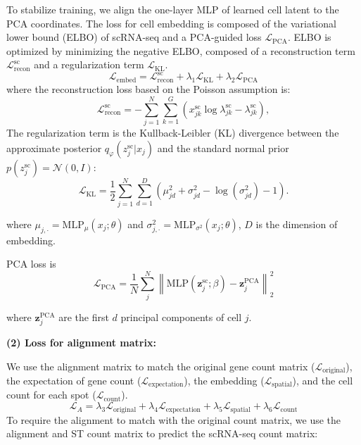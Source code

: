 \documentclass[10pt,a4paper]{article}
\begin{document}
To stabilize training, we align the one-layer MLP of learned cell latent to the PCA coordinates. The loss for cell embedding is composed of the variational lower bound (ELBO) of scRNA-seq and a PCA-guided loss $\mathcal{L}_{\mathrm{PCA}}$. ELBO is optimized by minimizing the negative ELBO, composed of a reconstruction term $\mathcal{L}_{\mathrm{recon}}^{\mathrm{sc}}$ and a regularization term $\mathcal{L}_{\mathrm{KL}}$.
\begin{equation}
\mathcal{L}_{\mathrm{embed}} = \mathcal{L}_{\mathrm{recon}}^{\mathrm{sc}} + \lambda_{1} \mathcal{L}_{\mathrm{KL}} + \lambda_{2} \mathcal{L}_{\mathrm{PCA}}
\end{equation}
where the reconstruction loss based on the Poisson assumption is:
\begin{equation}
\mathcal{L}_{\mathrm{recon}}^{\mathrm{sc}} = - \sum_{j=1}^{N} \sum_{k=1}^{G} \left( x_{jk}^{\mathrm{sc}} \log \lambda_{jk}^{\mathrm{sc}} - \lambda_{jk}^{\mathrm{sc}} \right),
\end{equation}
The regularization term is the Kullback-Leibler (KL) divergence between the approximate posterior $q_{\varphi}(z_{j}^{\mathrm{sc}} | x_{j})$ and the standard normal prior $p(z_{j}^{\mathrm{sc}}) = \mathcal{N}(0,I)$:
\begin{equation}
\mathcal{L}_{\mathrm{KL}} = \frac{1}{2} \sum_{j=1}^{N} \sum_{d=1}^{D} \left( \mu_{jd}^{2} + \sigma_{jd}^{2} - \log(\sigma_{jd}^{2}) - 1 \right).
\end{equation}

where $\mu_{j,\cdot} = \mathrm{MLP}_{\mu}(x_{j};\theta)$ and $\sigma_{j,\cdot}^{2} = \mathrm{MLP}_{\sigma^{2}}(x_{j};\theta)$, $D$ is the dimension of embedding.

PCA loss is
\begin{equation}
\mathcal{L}_{\mathrm{PCA}} = \frac{1}{N} \sum_{j}^{N} \left\| \mathrm{MLP}(\mathbf{z}_{j}^{\mathrm{sc}}; \beta) - \mathbf{z}_{j}^{\mathrm{PCA}} \right\|_{2}^{2}
\end{equation}

where $\mathbf{z}_{j}^{\mathrm{PCA}}$ are the first $d$ principal components of cell $j$.

\textbf{(2) Loss for alignment matrix:}

We use the alignment matrix to match the original gene count matrix ($\mathcal{L}_{\mathrm{original}}$), the expectation of gene count ($\mathcal{L}_{\mathrm{expectation}}$), the embedding ($\mathcal{L}_{\mathrm{spatial}}$), and the cell count for each spot ($\mathcal{L}_{\mathrm{count}}$).
\begin{equation}
\mathcal{L}_{A} = \lambda_{3} \mathcal{L}_{\mathrm{original}} + \lambda_{4} \mathcal{L}_{\mathrm{expectation}} + \lambda_{5} \mathcal{L}_{\mathrm{spatial}} + \lambda_{6} \mathcal{L}_{\mathrm{count}}
\end{equation}
To require the alignment to match with the original count matrix, we use the alignment and ST count matrix to predict the scRNA-seq count matrix:
\end{document}
